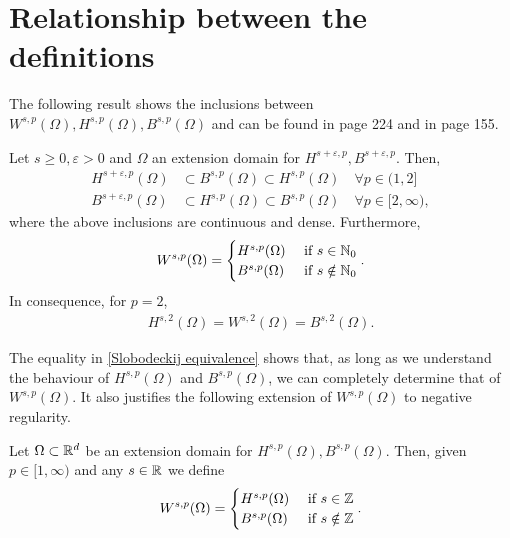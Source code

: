 \documentclass[
    a4paper,
    DIV=14,
    abstract=true,
    numbers=noenddot
]{scrartcl}
\begin{document}
\section{Relationship between the definitions}
The following result shows the inclusions between $W^{s,p}(\Omega ),H^{s,p}(\Omega ),B^{s,p}(\Omega )$ and can be found in \cite{agranovich2015sobolev} page 224 and in \cite{stein1970singular} page 155.
\begin{theorem}\label{equivalence fractional spaces}
    Let $s \geq 0, \varepsilon >0$ and  $\Omega$ an extension domain for $H^{s+\varepsilon,p},B^{s+\varepsilon,p}$. Then,
    \begin{align*}
        H^{s+\varepsilon,p}(\Omega ) & \subset B^{s,p}(\Omega )  \subset H^{s,p}(\Omega )\quad \forall p \in (1,2]       \\
        B^{s+\varepsilon,p}(\Omega ) & \subset H^{s,p}(\Omega )  \subset B^{s,p}(\Omega )\quad \forall p \in [2,\infty),
    \end{align*}
    where the above inclusions are continuous and dense. Furthermore,
    \begin{align}\label{Slobodeckij equivalence}
        W^{s,p}(\Omega )= \begin{cases}
                              H^{s,p}(\Omega ) & \text{ if } s \in \mathbb{N}_0    \\
                              B^{s,p}(\Omega ) & \text{ if } s \notin \mathbb{N}_0
                          \end{cases}.
    \end{align}
    In consequence, for $p=2$,
    \begin{align}\label{p=2}
        H^{s,2}(\Omega )=W^{s,2}(\Omega )=B^{s,2}(\Omega ).
    \end{align}
\end{theorem}
The equality in \eqref{Slobodeckij equivalence} shows that, as long as we understand the behaviour of $H^{s,p}(\Omega )$ and $B^{s,p}(\Omega )$, we can completely determine that of $W^{s,p}(\Omega )$. It also justifies the following extension of $W^{s,p}(\Omega )$ to negative regularity.
\begin{definition}\label{negative s Slobodeckij}
    Let $\Omega \subset \mathbb{R}^d$ be an extension domain for $H^{s,p}(\Omega ), B^{s,p}(\Omega )$. Then, given $p \in [1,\infty)$ and any  $s \in \mathbb{R}$ we define
    \begin{align*}
        W^{s,p}(\Omega )= \begin{cases}
                              H^{s,p}(\Omega ) & \text{ if } s \in \mathbb{Z}    \\
                              B^{s,p}(\Omega ) & \text{ if } s \notin \mathbb{Z}
                          \end{cases}.
    \end{align*}
\end{definition}
\end{document}
